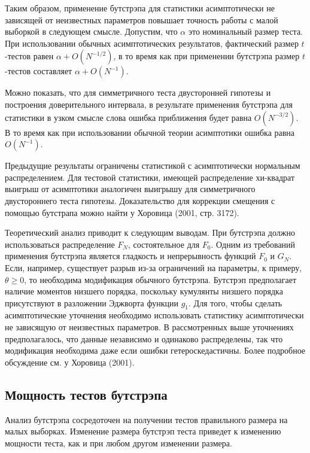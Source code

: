 Таким образом, применение бутстрэпа для статистики асимптотически  не зависящей от неизвестных параметров повышает точность работы с малой выборкой в следующем смысле. Допустим, что $\alpha$ это номинальный размер теста. При использовании обычных асимптотических результатов,  фактический размер $t$-тестов равен $\alpha+O(N^{-1/2})$, в то время как при применении бутстрэпа размер $t$-тестов составляет $\alpha+O(N^{-1})$.

Можно показать, что для симметричного теста двусторонней гипотезы и построения доверительного интервала, в результате применения бутстрэпа для статистики в узком смысле слова ошибка приближения будет равна $O(N^{-3/2})$. В то время как  при использовании обычной теории асимптотики ошибка равна $O(N^{-1})$. 

Предыдущие результаты ограничены статистикой с асимптотически нормальным распределением. Для тестовой статистики, имеющей распределение хи-квадрат выигрыш от асимптотики аналогичен выигрышу для симметричного двустороннего теста гипотезы. Доказательство для коррекции смещения с помощью бутстрапа можно найти у  Хоровица (2001, стр. 3172).

Теоретический анализ приводит к следующим выводам. При  бутстрэпа должно использоваться  распределение $F_N$, состоятельное для $F_0$. Одним из требований применения бутстрэпа является гладкость и непрерывность функций $F_0$ и $G_N$. Если, например, существует разрыв из-за ограничений на параметры, к примеру, $\theta \geq 0$, то необходима модификация обычного бутстрэпа. Бутстрэп предполагает наличие моментов низшего порядка, поскольку кумулянты низшего порядка присутствуют в разложении Эджворта функции $g_1$. Для того, чтобы сделать асимптотические уточнения необходимо использовать статистику асимптотически не зависящую от неизвестных параметров. В рассмотренных выше уточнениях предполагалось, что данные независимо и одинаково распределены, так что модификация необходима даже если ошибки гетероскедастичны. Более подробное обсуждение см. у Хоровица (2001). 


 \subsection{Мощность тестов бутстрэпа}

Анализ бутстрэпа сосредоточен на получении тестов правильного размера на малых выборках. Изменение размера бутстрэп теста приведет к изменению мощности теста, как и при любом другом изменении размера. 

